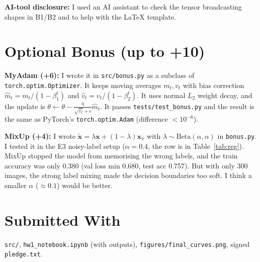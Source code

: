 \documentclass[conference,a4paper]{IEEEtran}
\begin{document}
\textbf{AI-tool disclosure:} I used an AI assistant to check the tensor broadcasting shapes in B1/B2 and to help with the LaTeX template.

\section*{Optional Bonus (up to +10)}
\textbf{MyAdam (+6):} I wrote it in \texttt{src/bonus.py} as a subclass of \texttt{torch.optim.Optimizer}. It keeps moving averages $m_t, v_t$ with bias correction $\hat{m}_t = m_t / (1 - \beta_1^t)$ and $\hat{v}_t = v_t / (1 - \beta_2^t)$. It uses normal $L_2$ weight decay, and the update is $\theta \leftarrow \theta - \frac{\eta}{\sqrt{\hat{v}_t} + \epsilon}\hat{m}_t$. It passes \texttt{tests/test\_bonus.py} and the result is the same as PyTorch's \texttt{torch.optim.Adam} (difference $< 10^{-6}$).

\textbf{MixUp (+4):} I wrote $\tilde{\mathbf{x}} = \lambda \mathbf{x} + (1-\lambda)\mathbf{x}_\pi$ with $\lambda \sim \text{Beta}(\alpha, \alpha)$ in \texttt{bonus.py}. I tested it in the E3 noisy-label setup ($\alpha=0.4$, the row is in Table~\ref{tab:reg}). MixUp stopped the model from memorising the wrong labels, and the train accuracy was only 0.380 (val loss min 0.680, test acc 0.757). But with only 300 images, the strong label mixing made the decision boundaries too soft. I think a smaller $\alpha$ ($\approx 0.1$) would be better.

\section*{Submitted With}
\texttt{src/}, \texttt{hw1\_notebook.ipynb} (with outputs),
\texttt{figures/final\_curves.png}, signed \texttt{pledge.txt}.
\end{document}
